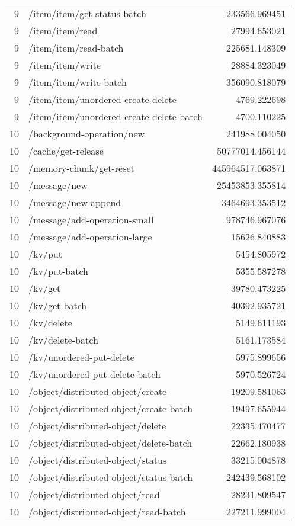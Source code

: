 \begin{longtable}{rlr}
9 & /item/item/get-status-batch & 233566.969451 \\
9 & /item/item/read & 27994.653021 \\
9 & /item/item/read-batch & 225681.148309 \\
9 & /item/item/write & 28884.323049 \\
9 & /item/item/write-batch & 356090.818079 \\
9 & /item/item/unordered-create-delete & 4769.222698 \\
9 & /item/item/unordered-create-delete-batch & 4700.110225 \\
10 & /background-operation/new & 241988.004050 \\
10 & /cache/get-release & 50777014.456144 \\
10 & /memory-chunk/get-reset & 445964517.063871 \\
10 & /message/new & 25453853.355814 \\
10 & /message/new-append & 3464693.353512 \\
10 & /message/add-operation-small & 978746.967076 \\
10 & /message/add-operation-large & 15626.840883 \\
10 & /kv/put & 5454.805972 \\
10 & /kv/put-batch & 5355.587278 \\
10 & /kv/get & 39780.473225 \\
10 & /kv/get-batch & 40392.935721 \\
10 & /kv/delete & 5149.611193 \\
10 & /kv/delete-batch & 5161.173584 \\
10 & /kv/unordered-put-delete & 5975.899656 \\
10 & /kv/unordered-put-delete-batch & 5970.526724 \\
10 & /object/distributed-object/create & 19209.581063 \\
10 & /object/distributed-object/create-batch & 19497.655944 \\
10 & /object/distributed-object/delete & 22335.470477 \\
10 & /object/distributed-object/delete-batch & 22662.180938 \\
10 & /object/distributed-object/status & 33215.004878 \\
10 & /object/distributed-object/status-batch & 242439.568102 \\
10 & /object/distributed-object/read & 28231.809547 \\
10 & /object/distributed-object/read-batch & 227211.999004 \\

\end{longtable}
